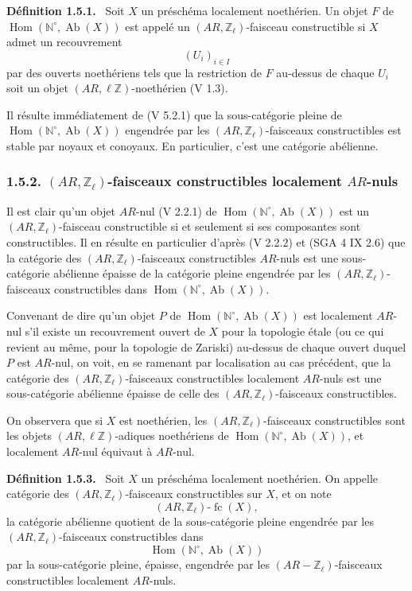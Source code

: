\documentclass[11pt]{article}
\newenvironment{statement}[1]{\par\medskip\noindent\textbf{#1.}\ }{\par\medskip}
\DeclareMathOperator{\Hom}{Hom}
\providecommand{\Hom}{\operatorname{Hom}}
\providecommand{\Ab}{\operatorname{Ab}}
\providecommand{\fc}{\operatorname{fc}}
\begin{document}
\begin{statement}{Définition 1.5.1}
Soit \(X\) un préschéma localement noethérien. Un objet \(F\) de \(\Hom(\mathbb N^\circ,\Ab(X))\) est appelé un \((AR,\mathbb Z_\ell)\)-faisceau constructible si \(X\) admet un recouvrement
\[
(U_i)_{i\in I}
\]
par des ouverts noethériens tels que la restriction de \(F\) au-dessus de chaque \(U_i\) soit un objet \((AR,\ell\mathbb Z)\)-noethérien (V 1.3).
\end{statement}

Il résulte immédiatement de (V 5.2.1) que la sous-catégorie pleine de \(\Hom(\mathbb N^\circ,\Ab(X))\) engendrée par les \((AR,\mathbb Z_\ell)\)-faisceaux constructibles est stable par noyaux et conoyaux. En particulier, c'est une catégorie abélienne.

\subsubsection*{1.5.2. \((AR,\mathbb Z_\ell)\)-faisceaux constructibles localement \(AR\)-nuls}

Il est clair qu'un objet \(AR\)-nul (V 2.2.1) de \(\Hom(\mathbb N^\circ,\Ab(X))\) est un \((AR,\mathbb Z_\ell)\)-faisceau constructible si et seulement si ses composantes sont constructibles. Il en résulte en particulier d'après (V 2.2.2) et (SGA 4 IX 2.6) que la catégorie des \((AR,\mathbb Z_\ell)\)-faisceaux constructibles \(AR\)-nuls est une sous-catégorie abélienne épaisse de la catégorie pleine engendrée par les \((AR,\mathbb Z_\ell)\)-faisceaux constructibles dans \(\Hom(\mathbb N^\circ,\Ab(X))\).

Convenant de dire qu'un objet \(P\) de \(\Hom(\mathbb N^\circ,\Ab(X))\) est localement \(AR\)-nul s'il existe un recouvrement ouvert de \(X\) pour la topologie étale (ou ce qui revient au même, pour la topologie de Zariski) au-dessus de chaque ouvert duquel \(P\) est \(AR\)-nul, on voit, en se ramenant par localisation au cas précédent, que la catégorie des \((AR,\mathbb Z_\ell)\)-faisceaux constructibles localement \(AR\)-nuls est une sous-catégorie abélienne épaisse de celle des \((AR,\mathbb Z_\ell)\)-faisceaux constructibles.

On observera que si \(X\) est noethérien, les \((AR,\mathbb Z_\ell)\)-faisceaux constructibles sont les objets \((AR,\ell\mathbb Z)\)-adiques noethériens de \(\Hom(\mathbb N^\circ,\Ab(X))\), et localement \(AR\)-nul équivaut à \(AR\)-nul.

\begin{statement}{Définition 1.5.3}
Soit \(X\) un préschéma localement noethérien. On appelle catégorie des \((AR,\mathbb Z_\ell)\)-faisceaux constructibles sur \(X\), et on note
\[
(AR,\mathbb Z_\ell)\text{-}\fc(X),
\]
la catégorie abélienne quotient de la sous-catégorie pleine engendrée par les \((AR,\mathbb Z_\ell)\)-faisceaux constructibles dans
\[
\Hom(\mathbb N^\circ,\Ab(X))
\]
par la sous-catégorie pleine, épaisse, engendrée par les \((AR-\mathbb Z_\ell)\)-faisceaux constructibles localement \(AR\)-nuls.
\end{statement}
\end{document}
